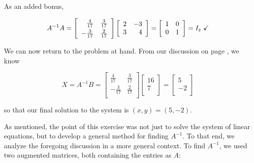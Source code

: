 \documentclass{ximera}
\begin{document}
As an added bonus, 

\[ A^{-1}A = \left[ \begin{array}{rr} \frac{4}{17} & \frac{3}{17} \\[3pt]  -\frac{3}{17} & \frac{2}{17} \\ \end{array} \right]\left[ \begin{array}{rr} 2 & -3 \\ 3 & 4 \\ \end{array} \right]  = \left[ \begin{array}{rr} 1 & 0 \\ 0 & 1 \\ \end{array} \right] = I_{\mbox{\tiny$2$}} \, \, \checkmark\]

We can now return to the problem at hand.  From our discussion  on page \pageref{solvingmatrixeqn}, we know

\[ X = A^{-1}B = \left[ \begin{array}{rr} \frac{4}{17} & \frac{3}{17} \\[3pt]  -\frac{3}{17} & \frac{2}{17} \\ \end{array} \right]\left[ \begin{array}{r} 16 \\ 7 \\ \end{array} \right] = \left[ \begin{array}{r} 5 \\ -2 \\ \end{array} \right] \]

so that our final solution to the system is $(x,y) = (5,-2)$.   

\smallskip

As mentioned, the point of this exercise was not just to solve the system of linear equations, but to develop a general method for finding $A^{-1}$.  To that end, we analyze the foregoing discussion in a more general context. To find $A^{-1}$, we used two augmented matrices, both containing the entries as $A$:
\end{document}
